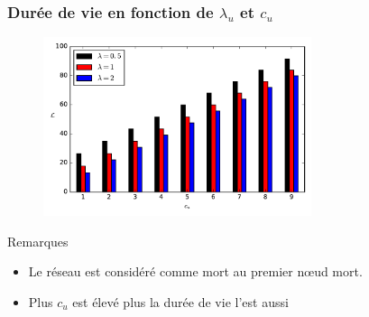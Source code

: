 \begin{frame}\frametitle{Durée de vie en fonction de $\lambda_u$ et $c_u$}

  \begin{figure}[ht]
    \centering
    \includegraphics[width=0.7\textwidth]{figures/new_lifetime.pdf}
  \end{figure}

  \begin{block}{Remarques}
    \begin{itemize}
      \item Le réseau est considéré comme mort au premier nœud mort.
      \item Plus $c_u$ est élevé plus la durée de vie l'est aussi
    \end{itemize}
  \end{block}

\end{frame}
